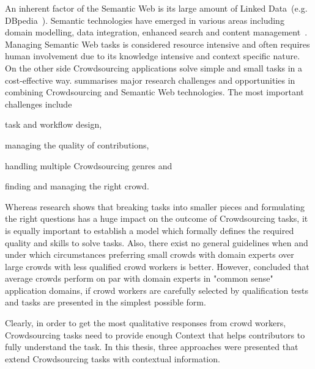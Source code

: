 An inherent factor of the Semantic Web is its large amount of Linked Data~(e.g. DBpedia~\cite{lehmann2015}). Semantic technologies have emerged in various areas including domain modelling, data integration, enhanced search and content management~\cite{semantic-web-usecases}. Managing Semantic Web tasks is considered resource intensive and often requires human involvement due to its knowledge intensive and context specific nature. On the other side Crowdsourcing applications solve simple and small tasks in a cost-effective way. \cite{sarasua2015crowdsourcing} summarises major research challenges and opportunities in combining Crowdsourcing and Semantic Web technologies. The most important challenges include 
\begin{inparaenum}[1)]
		\item task and workflow design,
		\item managing the quality of contributions,
		\item handling multiple Crowdsourcing genres and 
		\item finding and managing the right crowd.
\end{inparaenum}
Whereas research shows that breaking tasks into smaller pieces and formulating the right questions has a huge impact on the outcome of Crowdsourcing tasks, it is equally important to establish a model which formally defines the required quality and skills to solve tasks. Also, there exist no general guidelines when and under which circumstances preferring small crowds with domain experts over large crowds with less qualified crowd workers is better. However, \cite{mortensen2013} concluded that average crowds perform on par with domain experts in "common sense" application domains, if crowd workers are carefully selected by qualification tests and tasks are presented in the simplest possible form.

Clearly, in order to get the most qualitative responses from crowd workers, Crowdsourcing tasks need to provide enough Context that helps contributors to fully understand the task. In this thesis, three approaches were presented that extend Crowdsourcing tasks with contextual information.
